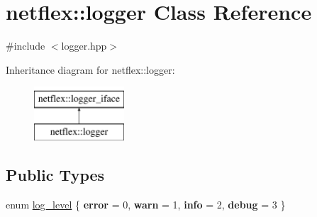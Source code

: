 \hypertarget{classnetflex_1_1logger}{}\section{netflex\+:\+:logger Class Reference}
\label{classnetflex_1_1logger}


{\ttfamily \#include $<$logger.\+hpp$>$}

Inheritance diagram for netflex\+:\+:logger\+:\begin{figure}[H]
\begin{center}
\leavevmode
\includegraphics[height=2.000000cm]{classnetflex_1_1logger}
\end{center}
\end{figure}
\subsection*{Public Types}
\begin{DoxyCompactItemize}
\item 
enum \hyperlink{classnetflex_1_1logger_a8270276b1351480a8a9bfab4139cdc9c}{log\+\_\+level} \{ {\bfseries error} = 0, 
{\bfseries warn} = 1, 
{\bfseries info} = 2, 
{\bfseries debug} = 3
 \}
\end{DoxyCompactItemize}

